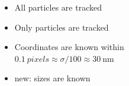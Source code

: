 \begin{frame}
\begin{columns}
	\begin{itemize}
		\item All particles are tracked
		\item Only particles are tracked
		\item Coordinates are known within\\
			$\SI{0.1}{pixels} \approx \sigma/100 \approx \SI{30}{\nano\metre}$
		\item \alert{new}: sizes are known
	\end{itemize}
	\end{columns}
\end{frame}

